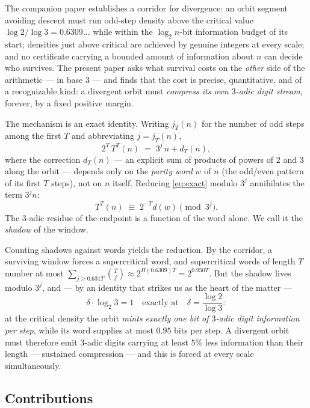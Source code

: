 \documentclass[11pt]{article}
\newcommand{\jodd}[2]{j_{#1}(#2)}
\begin{document}
The companion paper establishes a corridor for divergence: an orbit
segment avoiding descent must run odd-step density above the critical
value $\log 2/\log 3 = 0.6309\ldots$ while within the $\log_2 n$-bit
information budget of its start; densities just above critical are
achieved by genuine integers at every scale; and no certificate
carrying a bounded amount of information about $n$ can decide who
survives. The present paper asks what survival costs on the
\emph{other} side of the arithmetic --- in base $3$ --- and finds that
the cost is precise, quantitative, and of a recognizable kind: a
divergent orbit must \emph{compress its own $3$-adic digit stream},
forever, by a fixed positive margin.

The mechanism is an exact identity. Writing $\jodd{T}{n}$ for the
number of odd steps among the first $T$ and abbreviating
$j = \jodd{T}{n}$,
\begin{equation}\label{eq:exact}
2^T \, T^T(n) \;=\; 3^{j}\, n + d_T(n),
\end{equation}
where the correction $d_T(n)$ --- an explicit sum of products of
powers of $2$ and $3$ along the orbit --- depends only on the
\emph{parity word} $w$ of $n$ (the odd/even pattern of its first $T$
steps), not on $n$ itself. Reducing \eqref{eq:exact} modulo $3^{j}$
annihilates the term $3^j n$:
\[
T^T(n) \;\equiv\; 2^{-T} d(w) \pmod{3^{j}}.
\]
The $3$-adic residue of the endpoint is a function of the word alone.
We call it the \emph{shadow} of the window.

Counting shadows against words yields the reduction. By the corridor,
a surviving window forces a supercritical word, and supercritical
words of length $T$ number at most
$\sum_{j \ge 0.631T}\binom{T}{j} \approx 2^{H(0.6309)T} =
2^{0.950T}$. But the shadow lives modulo $3^{j}$, and --- by an
identity that strikes us as the heart of the matter ---
\[
\delta \cdot \log_2 3 = 1 \quad\text{exactly at}\quad
\delta = \frac{\log 2}{\log 3}:
\]
at the critical density the orbit \emph{mints exactly one bit of
$3$-adic digit information per step}, while its word supplies at most
$0.95$ bits per step. A divergent orbit must therefore emit $3$-adic
digits carrying at least $5\%$ less information than their length ---
sustained compression --- and this is forced at every scale
simultaneously.

\subsection*{Contributions}
\end{document}
